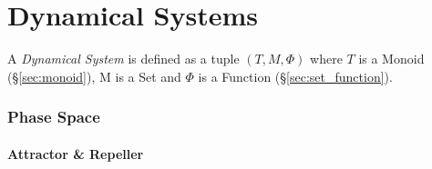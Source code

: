 \part{Dynamical Systems}\label{sec:dynamical_systems}

A \emph{Dynamical System} is defined as a tuple $(T,M,\Phi)$ where $T$
is a Monoid (\S\ref{sec:monoid}), M is a Set and $\Phi$ is a
Function (\S\ref{sec:set_function}).



\section{Phase Space}\label{sec:phase_space}

\subsection{Attractor \& Repeller}\label{sec:attractor_repeller}
